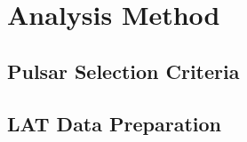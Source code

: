 \section{Analysis Method}

\subsection{Pulsar Selection Criteria}

\subsection{LAT Data Preparation}
